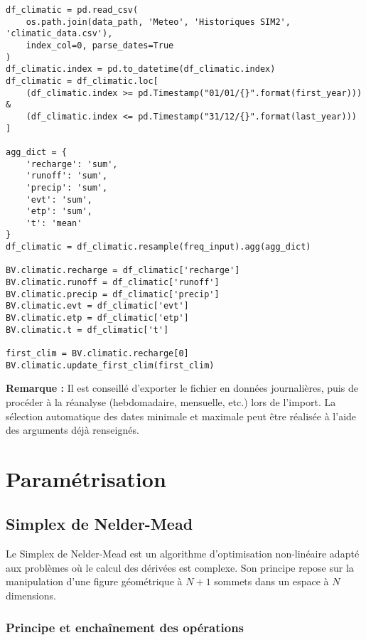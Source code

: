 \begin{verbatim}
df_climatic = pd.read_csv(
    os.path.join(data_path, 'Meteo', 'Historiques SIM2', 'climatic_data.csv'),
    index_col=0, parse_dates=True
)
df_climatic.index = pd.to_datetime(df_climatic.index)
df_climatic = df_climatic.loc[
    (df_climatic.index >= pd.Timestamp("01/01/{}".format(first_year))) &
    (df_climatic.index <= pd.Timestamp("31/12/{}".format(last_year)))
]

agg_dict = {
    'recharge': 'sum',
    'runoff': 'sum',
    'precip': 'sum',
    'evt': 'sum',
    'etp': 'sum',
    't': 'mean'
}
df_climatic = df_climatic.resample(freq_input).agg(agg_dict)

BV.climatic.recharge = df_climatic['recharge']
BV.climatic.runoff = df_climatic['runoff']
BV.climatic.precip = df_climatic['precip']
BV.climatic.evt = df_climatic['evt']
BV.climatic.etp = df_climatic['etp']
BV.climatic.t = df_climatic['t']

first_clim = BV.climatic.recharge[0]
BV.climatic.update_first_clim(first_clim)
\end{verbatim}

\begin{TipBox}
    \textbf{Remarque :} Il est conseillé d’exporter le fichier en données journalières, puis de procéder à la réanalyse (hebdomadaire, mensuelle, etc.) lors de l’import. La sélection automatique des dates minimale et maximale peut être réalisée à l’aide des arguments déjà renseignés.
\end{TipBox}

\section{Paramétrisation}
\label{sec:parametrisation}

\subsection{Simplex de Nelder-Mead}
\label{sec:simplex}

Le Simplex de Nelder-Mead est un algorithme d'optimisation non-linéaire adapté aux problèmes où le calcul des dérivées est complexe. Son principe repose sur la manipulation d'une figure géométrique à \(N+1\) sommets dans un espace à \(N\) dimensions.

\vspace{1em}

\subsubsection{Principe et enchaînement des opérations}

